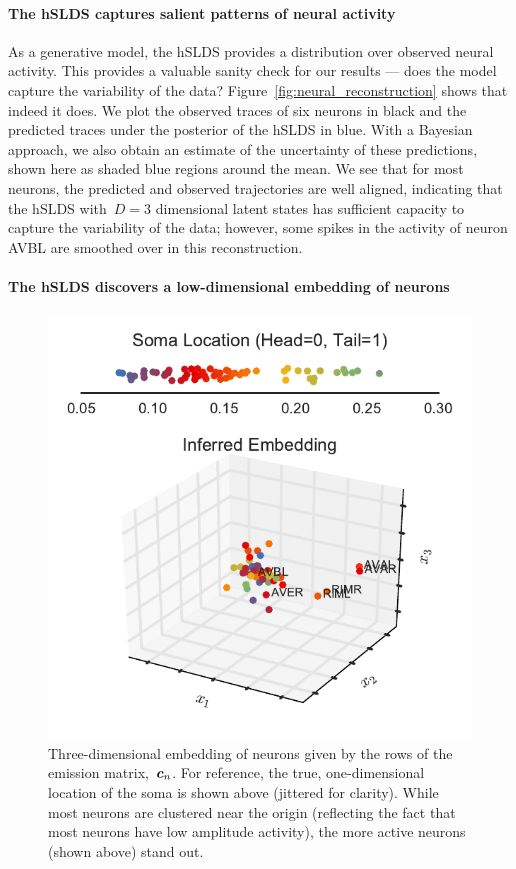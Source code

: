 \documentclass{article}
\begin{document}
\paragraph{The hSLDS captures salient patterns of neural activity}

As a generative model, the hSLDS provides a distribution over observed
neural activity. This provides a valuable sanity check for our results ---
does the model capture the variability of the data?
Figure~\ref{fig:neural_reconstruction} shows that indeed it does. We
plot the observed traces of six neurons in black and the predicted traces
under the posterior of the hSLDS in blue. With a Bayesian approach, we
also obtain an estimate of the uncertainty of these predictions, shown
here as shaded blue regions around the mean. We see that for most neurons,
the predicted and observed trajectories are well aligned, indicating that
the hSLDS with~$D=3$ dimensional latent states has sufficient capacity
to capture the variability of the data; however, some spikes in the activity
of neuron AVBL are smoothed over in this reconstruction. 

\paragraph{The hSLDS discovers a low-dimensional embedding of neurons}
\begin{figure}[t]
\centering%
\includegraphics[width=4.in]{neuron_embedding.pdf} 
\caption{Three-dimensional embedding of neurons given by the
  rows of the emission matrix,~$\boldsymbol{c}_n$. For reference, the
  true, one-dimensional location of the soma is shown above
  (jittered for clarity). While most neurons are clustered
  near the origin (reflecting the fact that most neurons
  have low amplitude activity), the more active neurons (shown
  above) stand out.}
\label{fig:neuron_embedding}
\end{figure}
\end{document}

